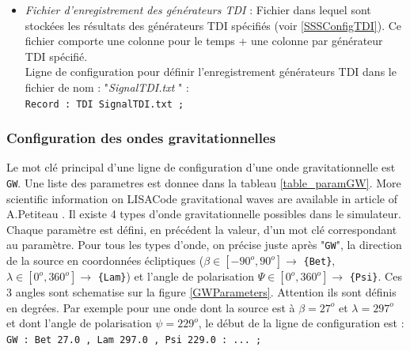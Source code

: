 \documentclass[a4paper,english,12pt]{article}
\begin{document}
\begin{itemize}
\item { \it Fichier d'enregistrement des g\'en\'erateurs TDI } : Fichier dans lequel sont stock\'ees les r\'esultats des g\'en\'erateurs TDI sp\'ecifi\'es (voir \ref{SSSConfigTDI}). Ce fichier comporte une colonne pour le temps + une colonne par g\'en\'erateur TDI sp\'ecifi\'e.\\
Ligne de configuration pour d\'efinir l'enregistrement g\'en\'erateurs TDI dans le fichier de nom :  "{\it SignalTDI.txt} " : \\
\hphantom{aaaaa}\texttt{Record : TDI SignalTDI.txt ;}  \\
\end{itemize}

\subsubsection{Configuration des ondes gravitationnelles}
\label{SSSConfigGW}
Le mot cl\'e principal d'une ligne de configuration d'une onde gravitationnelle est \texttt{GW}.  Une liste des parametres est donnee dans la tableau \ref{table_paramGW}.  More scientific information on LISACode gravitational waves are available in article of A.Petiteau \cite{LISACode}. Il existe 4 types d'onde gravitationnelle possibles dans le simulateur. Chaque param\`etre est d\'efini, en pr\'ec\'edent la valeur, d'un mot cl\'e correspondant au param\`etre. Pour tous les types d'onde, on pr\'ecise juste apr\`es "\texttt{GW}", la direction de la source en coordonn\'ees \'ecliptiques ($\beta \in \left[ -90^{o} , 90^{o} \right] \rightarrow$ \texttt{\{Bet\}}, $\lambda \in \left[ 0^{o} , 360^{o} \right] \rightarrow$ \texttt{\{Lam\}}) et l'angle de polarisation $\Psi \in \left[ 0^{o} , 360^{o} \right] \rightarrow$ \texttt{\{Psi\}}. Ces 3 angles sont schematise sur la figure \ref{GWParameters}.  Attention ils sont d\'efinis en degr\'ees. Par exemple pour une onde dont la source est \`a $\beta = 27^{o}$ et $\lambda = 297^{o}$ et dont l'angle de polarisation $\psi = 229^{o}$, le d\'ebut de la ligne de configuration est : \\
\hphantom{aaaaa}\texttt{GW : Bet 27.0 , Lam 297.0 , Psi 229.0 : ... ;}  \\
\end{document}
